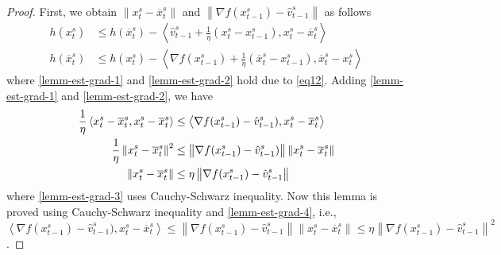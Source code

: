 \documentclass{article}
\newcommand{\norm}[1]{\left\lVert#1\right\rVert}
\newcommand{\Iprod}[2]{\left\langle #1,#2\right\rangle}
\theoremstyle{definition}
\theoremstyle{remark}
\begin{document}
\begin{proof}
First, we obtain $\norm{x_{t}^s-\overline{x}_{t}^s}$ and $\norm{\nabla f(x_{t-1}^s)-\hat{v}_{t-1}^s}$ as follows 
\begin{align}
h(x_t^s)&\leq h(\overline{x}_t^s) - \Iprod{\hat{v}_{t-1}^s+\frac{1}{\eta}(x_t^s-x_{t-1}^s)}{x_t^s-\overline{x}_t^s}\label{lemm-est-grad-1}\\
h(\overline{x}_t^s)&\leq h({x}_t^s) - \Iprod{\nabla f(x_{t-1}^s)+\frac{1}{\eta}(\overline{x}_t^s-x_{t-1}^s)}{\overline{x}_t^s-x_t^s}\label{lemm-est-grad-2}
\end{align}
where \eqref{lemm-est-grad-1} and \eqref{lemm-est-grad-2} hold due to \eqref{eq12}. Adding \eqref{lemm-est-grad-1} and \eqref{lemm-est-grad-2}, we have 
\begin{align}
\frac{1}{\eta}\Iprod{x_t^s -\overline{x}_t^s}{x_t^s -\overline{x}_t^s} &\leq \Iprod{\nabla f(x_{t-1}^s) -\hat{v}_{t-1}^s)}{x_t^s -\overline{x}_t^s}\notag\\
\frac{1}{\eta}\norm{x_t^s -\overline{x}_t^s}^2 &\leq \norm{\nabla f(x_{t-1}^s) -\hat{v}_{t-1}^s)}\norm{x_t^s -\overline{x}_t^s}\label{lemm-est-grad-3}\\
\norm{x_t^s -\overline{x}_t^s} &\leq \eta\norm{\nabla f(x_{t-1}^s) -\hat{v}_{t-1}^s}\label{lemm-est-grad-4}
\end{align}
where \eqref{lemm-est-grad-3} uses Cauchy-Schwarz inequality. Now this lemma is proved using Cauchy-Schwarz inequality and \eqref{lemm-est-grad-4}, i.e., $\Iprod{\nabla f(x_{t-1}^s) -\hat{v}_{t-1}^s)}{x_t^s -\overline{x}_t^s} \leq \norm{\nabla f(x_{t-1}^s)-\hat{v}_{t-1}^s} \norm{x_t^s -\overline{x}_t^s} \leq \eta\norm{\nabla f(x_{t-1}^s)-\hat{v}_{t-1}^s}^2$.
\end{proof}
\end{document}

